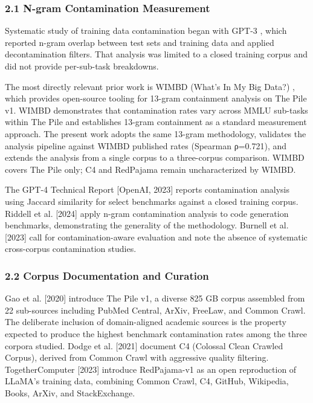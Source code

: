 
\subsubsection{2.1 N-gram Contamination Measurement}

Systematic study of training data contamination began with GPT-3 \citep{Brownetal2020}, which reported n-gram overlap between test sets and training data and applied decontamination filters. That analysis was limited to a closed training corpus and did not provide per-sub-task breakdowns.

The most directly relevant prior work is WIMBD (What's In My Big Data?) \citep{Elazaretal2023}, which provides open-source tooling for 13-gram containment analysis on The Pile v1. WIMBD demonstrates that contamination rates vary across MMLU sub-tasks within The Pile and establishes 13-gram containment as a standard measurement approach. The present work adopts the same 13-gram methodology, validates the analysis pipeline against WIMBD published rates (Spearman ρ=0.721), and extends the analysis from a single corpus to a three-corpus comparison. WIMBD covers The Pile only; C4 and RedPajama remain uncharacterized by WIMBD.

The GPT-4 Technical Report [OpenAI, 2023] reports contamination analysis using Jaccard similarity for select benchmarks against a closed training corpus. Riddell et al. [2024] apply n-gram contamination analysis to code generation benchmarks, demonstrating the generality of the methodology. Burnell et al. [2023] call for contamination-aware evaluation and note the absence of systematic cross-corpus contamination studies.

\subsubsection{2.2 Corpus Documentation and Curation}

Gao et al. [2020] introduce The Pile v1, a diverse 825 GB corpus assembled from 22 sub-sources including PubMed Central, ArXiv, FreeLaw, and Common Crawl. The deliberate inclusion of domain-aligned academic sources is the property expected to produce the highest benchmark contamination rates among the three corpora studied. Dodge et al. [2021] document C4 (Colossal Clean Crawled Corpus), derived from Common Crawl with aggressive quality filtering. TogetherComputer [2023] introduce RedPajama-v1 as an open reproduction of LLaMA's training data, combining Common Crawl, C4, GitHub, Wikipedia, Books, ArXiv, and StackExchange.


